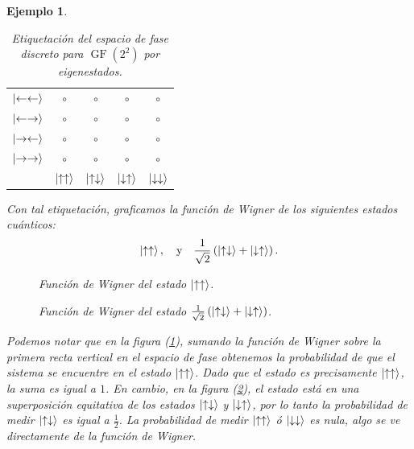 \documentclass[a4paper]{report}
\DeclareMathOperator{\GF}{GF}
\newtheorem{example}{Ejemplo}
\begin{document}
\begin{example}
    \begin{table}[!ht]
      \centering
      \begin{tabular}{c c c c c}
        $\ket{\leftarrow\leftarrow}$ & $\circ$ & $\circ$ &
        $\circ$ & $\circ$ \\[7pt]
        $\ket{\leftarrow\rightarrow}$ & $\circ$ & $\circ$ &
        $\circ$ & $\circ$ \\[7pt]
        $\ket{\rightarrow\leftarrow}$ & $\circ$ & $\circ$ &
        $\circ$ & $\circ$ \\[7pt]
        $\ket{\rightarrow\rightarrow}$ & $\circ$ & $\circ$ &
        $\circ$ & $\circ$ \\[7pt]
        & $\ket{\uparrow\uparrow}$ &
        $\ket{\uparrow\downarrow}$
        & $\ket{\downarrow\uparrow}$ &
        $\ket{\downarrow\downarrow}$
      \end{tabular}
      \caption{Etiquetación del espacio de fase discreto
      para $\GF(2^2)$ por eigenestados.}
      \label{tab:state_phase_space}
    \end{table}

    Con tal etiquetación, graficamos la función de Wigner de
    los siguientes estados cuánticos:
    \[
      \ket{\uparrow\uparrow},
      \quad
      \text{y}
      \quad
      \frac{1}{\sqrt{2}} \left( \ket{\uparrow\downarrow} +
      \ket{\downarrow\uparrow} \right). 
    \]
    
    \begin{figure}[ht]
      \centering
      \scalebox{0.7}{
        
      }
      \caption{Función de Wigner del estado
        $\ket{\uparrow\uparrow}$.}
      \label{fig:wigner-desargues-2-2-s1}
    \end{figure}

    \begin{figure}[!ht]
      \centering
      \scalebox{0.7}{
        
      }
      \caption{Función de Wigner del estado
      $\frac{1}{\sqrt{2}}\left(\ket{\uparrow\downarrow} +
      \ket{\downarrow\uparrow}\right)$.}
      \label{fig:wigner-desargues-2-2-s2}
    \end{figure}

    Podemos notar que en la figura
    (\ref{fig:wigner-desargues-2-2-s1}), sumando la función
    de Wigner sobre la primera recta vertical en el espacio
    de fase obtenemos la probabilidad de que el sistema se
    encuentre en el estado $\ket{\uparrow\uparrow}$. Dado
    que el estado es precisamente $\ket{\uparrow\uparrow}$,
    la suma es igual a $1$. En cambio, en la figura
    (\ref{fig:wigner-desargues-2-2-s2}), el estado está en
    una superposición equitativa de los estados
    $\ket{\uparrow\downarrow}$ y
    $\ket{\downarrow\uparrow}$, por lo tanto la probabilidad
    de medir $\ket{\uparrow\downarrow}$ es igual a
    $\frac{1}{2}$. La probabilidad de medir
    $\ket{\uparrow\uparrow}$ ó $\ket{\downarrow\downarrow}$ 
    es nula, algo se ve directamente de la función de
    Wigner.
  \end{example}
\end{document}
